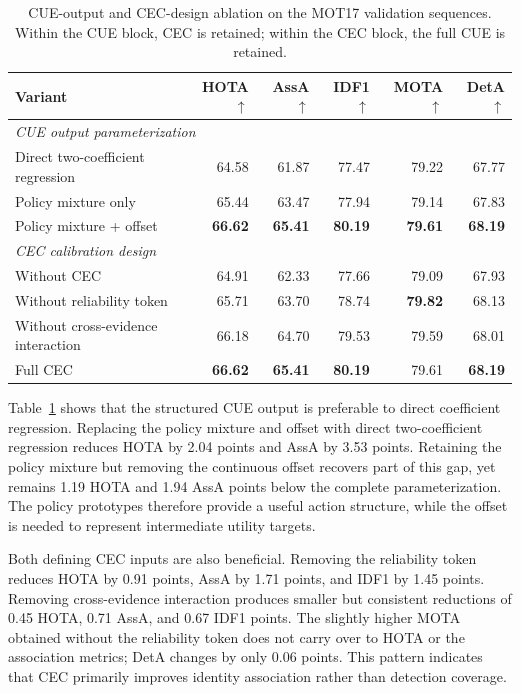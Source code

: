 \documentclass[a4paper,fleqn]{cas-sc}
\begin{document}
\begin{table}[pos=!ht]
\centering
\caption{CUE-output and CEC-design ablation on the MOT17 validation sequences. Within the CUE block, CEC is retained; within the CEC block, the full CUE is retained.}
\label{tab:design_ablation}
{\footnotesize
\begin{tabular*}{\textwidth}{@{\extracolsep{\fill}}lrrrrr@{}}
\toprule
Variant & HOTA$\uparrow$ & AssA$\uparrow$ & IDF1$\uparrow$ & MOTA$\uparrow$ & DetA$\uparrow$ \\
\midrule
\multicolumn{6}{l}{\textit{CUE output parameterization}} \\
Direct two-coefficient regression & 64.58 & 61.87 & 77.47 & 79.22 & 67.77 \\
Policy mixture only & 65.44 & 63.47 & 77.94 & 79.14 & 67.83 \\
Policy mixture + offset & \textbf{66.62} & \textbf{65.41} & \textbf{80.19} & \textbf{79.61} & \textbf{68.19} \\
\midrule
\multicolumn{6}{l}{\textit{CEC calibration design}} \\
Without CEC & 64.91 & 62.33 & 77.66 & 79.09 & 67.93 \\
Without reliability token & 65.71 & 63.70 & 78.74 & \textbf{79.82} & 68.13 \\
Without cross-evidence interaction & 66.18 & 64.70 & 79.53 & 79.59 & 68.01 \\
Full CEC & \textbf{66.62} & \textbf{65.41} & \textbf{80.19} & 79.61 & \textbf{68.19} \\
\bottomrule
\end{tabular*}}
\end{table}

Table~\ref{tab:design_ablation} shows that the structured CUE output is preferable to direct coefficient regression. Replacing the policy mixture and offset with direct two-coefficient regression reduces HOTA by 2.04 points and AssA by 3.53 points. Retaining the policy mixture but removing the continuous offset recovers part of this gap, yet remains 1.19 HOTA and 1.94 AssA points below the complete parameterization. The policy prototypes therefore provide a useful action structure, while the offset is needed to represent intermediate utility targets.

Both defining CEC inputs are also beneficial. Removing the reliability token reduces HOTA by 0.91 points, AssA by 1.71 points, and IDF1 by 1.45 points. Removing cross-evidence interaction produces smaller but consistent reductions of 0.45 HOTA, 0.71 AssA, and 0.67 IDF1 points. The slightly higher MOTA obtained without the reliability token does not carry over to HOTA or the association metrics; DetA changes by only 0.06 points. This pattern indicates that CEC primarily improves identity association rather than detection coverage.
\end{document}
